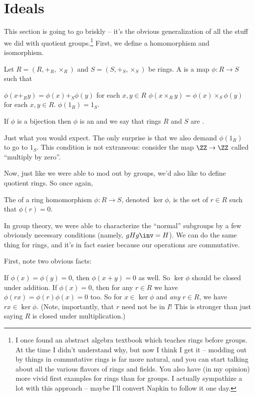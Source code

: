 \section{Ideals}
This section is going to go briskly --
it's the obvious generalization of all the stuff we did with quotient groups.\footnote{%
	I once found an abstract algebra textbook which teaches rings
	before groups.  At the time I didn't understand why,
	but now I think I get it -- modding out by things in
	commutative rings is far more natural, and you can start talking
	about all the various flavors of rings and fields.
	You also have (in my opinion) more vivid first examples
	for rings than for groups.
	I actually sympathize a lot with this approach -- maybe I'll convert
	Napkin to follow it one day.}
First, we define a homomorphism and isomorphism.

\begin{definition}
	Let $R = (R, +_R, \times_R)$ and $S = (S, +_S, \times_S)$ be rings.
	A  is a map $\phi : R \to S$
	such that 
	\begin{enumerate}[(i)]
		\ii $\phi(x +_R y) = \phi(x) +_S \phi(y)$ for each $x,y \in R$
		\ii $\phi(x \times_R y) = \phi(x) \times_S \phi(y)$ for each $x,y \in R$.
		\ii $\phi(1_R) = 1_S$.
	\end{enumerate}
	If $\phi$ is a bijection then $\phi$ is an 
	and we say that rings $R$ and $S$ are .
\end{definition}
Just what you would expect.
The only surprise is that we also demand $\phi(1_R)$ to go to $1_S$.
This condition is not extraneous:
consider the map $\ZZ \to \ZZ$ called ``multiply by zero''.

Now, just like we were able to mod out by groups, we'd also like to define quotient rings.
So once again,
\begin{definition}
	The  of a ring homomorphism $\phi : R \to S$,
	denoted $\ker \phi$, is the set of $r \in R$ such that $\phi(r) = 0$.
\end{definition}

In group theory, we were able to characterize the ``normal'' subgroups by a few
obviously necessary conditions (namely, $gHg\inv = H$).
We can do the same thing for rings, and it's in fact easier because our operations are commutative.

First, note two obvious facts:
\begin{itemize}
	\ii If $\phi(x) = \phi(y) = 0$, then $\phi(x+y) = 0$ as well.
	So $\ker \phi$ should be closed under addition.
	\ii If $\phi(x) = 0$, then for any $r \in R$ we have
	$\phi(rx) = \phi(r)\phi(x) = 0$ too.
	So for $x \in \ker \phi$ and \emph{any} $r \in R$,
	we have $rx \in \ker\phi$.
	(Note, importantly, that $r$ need not be in $I$! This is stronger than just saying $R$
	is closed under multiplication.)
\end{itemize}

